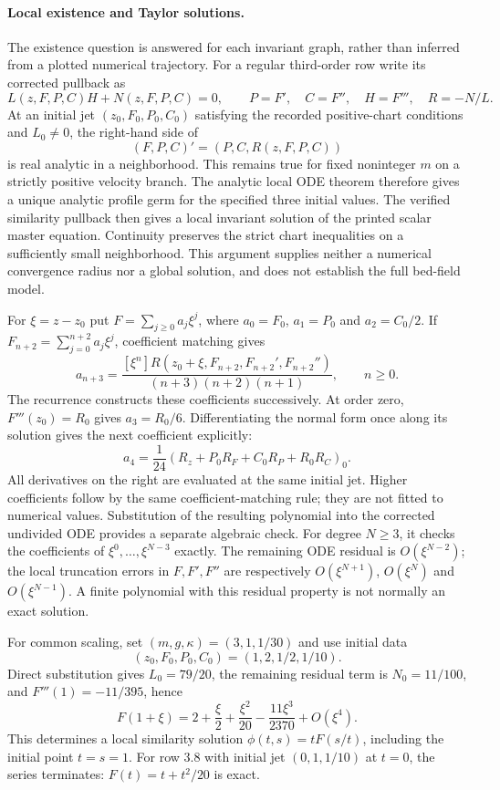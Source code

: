 \paragraph{Local existence and Taylor solutions.}
The existence question is answered for each invariant graph, rather than
inferred from a plotted numerical trajectory. For a regular third-order row
write its corrected pullback as
\[
 L(z,F,P,C)H+N(z,F,P,C)=0,\qquad
 P=F',\quad C=F'',\quad H=F''',\quad R=-N/L.
\]
At an initial jet $(z_0,F_0,P_0,C_0)$ satisfying the recorded positive-chart
conditions and $L_0\ne0$, the right-hand side of
\[
 (F,P,C)'=(P,C,R(z,F,P,C))
\]
is real analytic in a neighborhood. This remains true for fixed noninteger
$m$ on a strictly positive velocity branch. The analytic local ODE theorem
\cite[Section~4.1]{teschl2012}
therefore gives a unique analytic profile germ for the specified three
initial values. The verified similarity pullback then gives a local invariant
solution of the printed scalar master equation. Continuity preserves the
strict chart inequalities on a sufficiently small neighborhood. This
argument supplies neither a numerical convergence radius nor a global
solution, and does not establish the full bed-field model.

For $\xi=z-z_0$ put $F=\sum_{j\geq0}a_j\xi^j$, where
$a_0=F_0$, $a_1=P_0$ and $a_2=C_0/2$. If
$F_{n+2}=\sum_{j=0}^{n+2}a_j\xi^j$, coefficient matching gives
\begin{equation}
 a_{n+3}=
 \frac{[\xi^n]R(z_0+\xi,F_{n+2},F_{n+2}',F_{n+2}'')}
 {(n+3)(n+2)(n+1)},\qquad n\geq0.
 \label{eq:sve-series-recurrence}
\end{equation}
The recurrence constructs these coefficients successively. At order zero,
$F'''(z_0)=R_0$ gives $a_3=R_0/6$. Differentiating the normal form once
along its solution gives the next coefficient explicitly:
\[
 a_4=\frac1{24}\left(R_z+P_0R_F+C_0R_P+R_0R_C\right)_0.
\]
All derivatives on the right are evaluated at the same initial jet. Higher
coefficients follow by the same coefficient-matching rule; they are not
fitted to numerical values. Substitution of the resulting polynomial into
the corrected undivided ODE provides a separate algebraic check. For degree $N\geq3$, it checks the coefficients of
$\xi^0,\ldots,\xi^{N-3}$ exactly. The remaining ODE residual is
$O(\xi^{N-2})$; the local truncation errors in $F,F',F''$ are respectively
$O(\xi^{N+1})$, $O(\xi^N)$ and $O(\xi^{N-1})$. A finite polynomial with
this residual property is not normally an exact solution.

For common scaling, set $(m,g,\kappa)=(3,1,1/30)$ and use initial data
\[
 (z_0,F_0,P_0,C_0)=(1,2,1/2,1/10).
\]
Direct substitution gives
$L_0=79/20$, the remaining residual term is $N_0=11/100$, and $F'''(1)=-11/395$, hence
\[
 F(1+\xi)=2+\frac{\xi}{2}+\frac{\xi^2}{20}
             -\frac{11\xi^3}{2370}+O(\xi^4).
\]
This determines a local similarity solution $\phi(t,s)=tF(s/t)$, including
the initial point $t=s=1$. For row 3.8 with initial jet $(0,1,1/10)$ at
$t=0$, the series terminates: $F(t)=t+t^2/20$ is exact.

